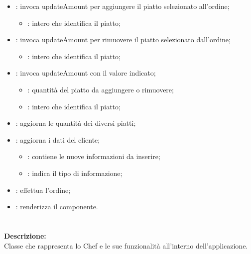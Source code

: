 \begin{itemize}
	\item {}: invoca updateAmount per aggiungere il piatto selezionato all'ordine;
		\begin{itemize}
			\item {}: intero che identifica il piatto;
		\end{itemize}
	\item {}: invoca updateAmount per rimuovere il piatto selezionato dall'ordine;
		\begin{itemize}
			\item {}: intero che identifica il piatto;
		\end{itemize}
	\item {}: invoca updateAmount con il valore indicato;
		\begin{itemize}
			\item {}: quantità del piatto da aggiungere o rimuovere;
			\item {}: intero che identifica il piatto;
		\end{itemize}
	\item {}: aggiorna le quantità dei diversi piatti;
	\item {}: aggiorna i dati del cliente;
		\begin{itemize}
			\item {}: contiene le nuove informazioni da inserire;
			\item {}: indica il tipo di informazione;
		\end{itemize}
	\item {}: effettua l'ordine;
	\item {}: renderizza il componente.
\end{itemize}

\paragraph[::ChefBubble]{\class}\mbox{}\\ \label{\class}
\textbf{Descrizione:}\\
Classe che rappresenta lo Chef e le sue funzionalità all'interno dell'applicazione.

